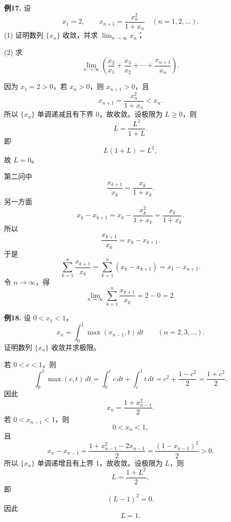 \begin{problemblock}
\textbf{例17.} 设
\[
x_1=2,\qquad x_{n+1}=\frac{x_n^2}{1+x_n}\quad(n=1,2,\dots).
\]
(1) 证明数列 \(\{x_n\}\) 收敛，并求 \(\displaystyle\lim_{n\to\infty}x_n\)；

(2) 求
\[
\lim_{n\to\infty}\left(
\frac{x_2}{x_1}+\frac{x_3}{x_2}+\cdots+\frac{x_{n+1}}{x_n}
\right).
\]
\end{problemblock}

\begin{solutionblock}

因为 \(x_1=2>0\)，若 \(x_n>0\)，则 \(x_{n+1}>0\)，且
\[
x_{n+1}=\frac{x_n^2}{1+x_n}<x_n.
\]
所以 \(\{x_n\}\) 单调递减且有下界 0，故收敛。设极限为 \(L\ge0\)，则
\[
L=\frac{L^2}{1+L}.
\]
即
\[
L(1+L)=L^2,
\]
故 \(L=0\)。

第二问中
\[
\frac{x_{k+1}}{x_k}=\frac{x_k}{1+x_k}.
\]
另一方面
\[
x_k-x_{k+1}
=x_k-\frac{x_k^2}{1+x_k}
=\frac{x_k}{1+x_k}.
\]
所以
\[
\frac{x_{k+1}}{x_k}=x_k-x_{k+1}.
\]
于是
\[
\sum_{k=1}^n\frac{x_{k+1}}{x_k}
=\sum_{k=1}^n(x_k-x_{k+1})
=x_1-x_{n+1}.
\]
令 \(n\to\infty\)，得
\[
\lim_{n\to\infty}\sum_{k=1}^n\frac{x_{k+1}}{x_k}
=2-0=2.
\]

\end{solutionblock}

\begin{problemblock}
\textbf{例18.} 设 \(0<x_1<1\)，
\[
x_n=\int_0^1\max(x_{n-1},t)\,dt\qquad(n=2,3,\dots).
\]
证明数列 \(\{x_n\}\) 收敛并求极限。
\end{problemblock}

\begin{solutionblock}

若 \(0<c<1\)，则
\[
\int_0^1\max(c,t)\,dt
=\int_0^c c\,dt+\int_c^1t\,dt
=c^2+\frac{1-c^2}{2}
=\frac{1+c^2}{2}.
\]
因此
\[
x_n=\frac{1+x_{n-1}^2}{2}.
\]
若 \(0<x_{n-1}<1\)，则
\[
0<x_n<1,
\]
且
\[
x_n-x_{n-1}
=\frac{1+x_{n-1}^2-2x_{n-1}}2
=\frac{(1-x_{n-1})^2}{2}>0.
\]
所以 \(\{x_n\}\) 单调递增且有上界 1，故收敛。设极限为 \(L\)，则
\[
L=\frac{1+L^2}{2},
\]
即
\[
(L-1)^2=0.
\]
因此
\[
L=1.
\]

\end{solutionblock}

